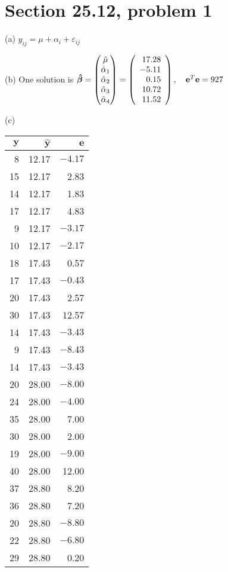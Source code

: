 \section{Section 25.12, problem 1}
(a) $y_{ij}=\mu+\alpha_i+\varepsilon_{ij}$

\noindent
(b) One solution is
$\bm{\hat\beta}=
\begin{pmatrix}
\hat\mu\cr
\hat\alpha_1\cr
\hat\alpha_2\cr
\hat\alpha_3\cr
\hat\alpha_4
\end{pmatrix}=
\left(
\begin{array}{r}
17.28\\
-5.11\\
0.15\\
10.72\\
11.52
\end{array}
\right),\quad
\mathbf e^T\mathbf e=927
$

\noindent
(c)
\begin{center}
\begin{tabular}{|r|r|r|}
\hline
$\mathbf y$ & $\mathbf{\hat y}$ & $\mathbf e$\\
\hline
  8 & 12.17 & $-4.17$\\
  15 &12.17 & 2.83\\
  14 &12.17 & 1.83\\
  17 &12.17 & 4.83\\
   9 &12.17 & $-3.17$\\
  10 &12.17 & $-2.17$\\
  18 &17.43 & 0.57\\
  17 &17.43 & $-0.43$\\
  20 &17.43 & 2.57\\
 30 &17.43 & 12.57\\
 14 &17.43 & $-3.43$\\
  9 &17.43 & $-8.43$\\
 14 &17.43 & $-3.43$\\
 20 &28.00 & $-8.00$\\
 24 &28.00 & $-4.00$\\
 35 &28.00 &  7.00\\
 30 &28.00 & 2.00\\
 19 &28.00 & $-9.00$\\
 40 &28.00 & 12.00\\
 37 &28.80 & 8.20\\
 36 &28.80 & 7.20\\
 20 &28.80 & $-8.80$\\
 22 &28.80 & $-6.80$\\
 29 &28.80 & 0.20\\
 \hline
\end{tabular}
\end{center}

